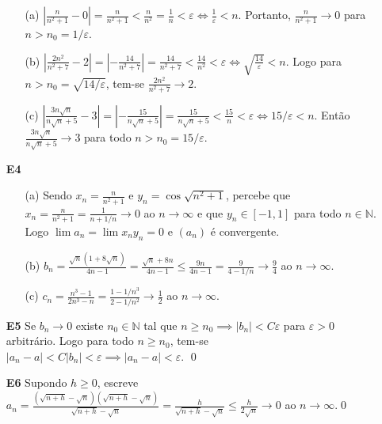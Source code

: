 \documentclass{article}
\begin{document}
\begin{enumerate}
\begin{enumerate}
            \item [(a)] \(\displaystyle\left\vert \frac{n}{n^2+1} - 0 \right\vert = \frac{n}{n^2+1} < \frac{n}{n^2} = \frac{1}{n} < \varepsilon \iff \frac{1}{\varepsilon} < n\). Portanto, \(\displaystyle\frac{n}{n^2+1} \to 0\) para \(n > n_0 = 1/\varepsilon\).
            \item [(b)] \(\displaystyle\left\vert \frac{2n^2}{n^2+7} - 2 \right\vert = \left\vert -\frac{14}{n^2+7} \right\vert = \frac{14}{n^2+7} < \frac{14}{n^2} < \varepsilon \iff \sqrt{\frac{14}{\varepsilon}} < n\). Logo para \(n > n_0 = \sqrt{14/\varepsilon}\), tem-se \(\displaystyle\frac{2n^2}{n^2+7} \to 2\).
            \item [(c)] \(\displaystyle\left\vert \frac{3n\sqrt{n}}{n\sqrt{n}+5} - 3 \right\vert = \left\vert -\frac{15}{n\sqrt{n}+5} \right\vert = \frac{15}{n\sqrt{n}+5} < \frac{15}{n} < \varepsilon \iff 15/\varepsilon < n\). Então \(\displaystyle\frac{3n\sqrt{n}}{n\sqrt{n}+5} \to 3\) para todo \(n > n_0 = 15/\varepsilon\).
        \end{enumerate}
    \item [\textbf{E4}]
        \begin{enumerate}
            \item [(a)] Sendo \(\displaystyle x_n = \frac{n}{n^2+1}\) e \(y_n = \cos{\sqrt{n^2+1}}\), percebe que \(\displaystyle x_n = \frac{n}{n^2+1} = \frac{1}{n+1/n} \to 0\) ao \(n \to \infty\) e que \(y_n \in [-1,1]\) para todo \(n \in \mathbb{N}\). Logo \(\lim a_n = \lim x_n y_n = 0\) e \((a_n)\) é convergente.
            \item [(b)] \(\displaystyle b_n = \frac{\sqrt{n}(1+8\sqrt{n})}{4n-1} = \frac{\sqrt{n}+8n}{4n-1} \leq \frac{9n}{4n-1} = \frac{9}{4-1/n} \to \frac{9}{4}\) ao \(n \to \infty\).
            \item [(c)] \(\displaystyle c_n = \frac{n^3-1}{2n^3-n} = \frac{1-1/n^3}{2-1/n^2} \to \frac{1}{2}\) ao \(n \to \infty\).
        \end{enumerate}
    \item [\textbf{E5}] Se \(b_n \to 0\) existe \(n_0 \in \mathbb{N}\) tal que \(n \geq n_0 \implies |b_n| < C\varepsilon\) para \(\varepsilon > 0\) arbitrário. Logo para todo \(n \geq n_0\), tem-se \(\vert a_n - a \vert < C\vert b_n \vert < \varepsilon \implies \vert a_n - a \vert < \varepsilon\). \qed
    \item [\textbf{E6}] Supondo \(h \geq 0\), escreve \(\displaystyle a_n = \frac{(\sqrt{n+h}-\sqrt{n})(\sqrt{n+h}-\sqrt{n})}{\sqrt{n+h}-\sqrt{n}} = \frac{h}{\sqrt{n+h}-\sqrt{n}} \leq \frac{h}{2\sqrt{n}} \to 0\) ao \(n \to \infty\).\qed 

\end{enumerate}
\end{document}
